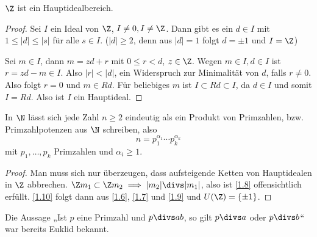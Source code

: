 \begin{lem} \label{1.9}
	$\Z$ ist ein Hauptidealbereich.
	\begin{proof}
		Sei $I$ ein Ideal von $\Z$, $I \neq 0, I \neq \Z$.
		Dann gibt es ein $d \in I$ mit $1 \le |d| \le |s|$ für alle $s \in I$.
		($|d| \ge 2$, denn aus $|d|=1$ folgt $d = \pm 1$ und $I = \Z$)

		Sei $m \in I$, dann $m = zd + r$ mit $0 \le r < d$, $z \in \Z$.
		Wegen $m \in I, d\in I$ ist $r = zd - m \in I$.
		Also $|r| < |d|$, ein Widerspruch zur Minimalität von $d$, falls $r \neq 0$.
		Also folgt $r = 0$ und $m \in Rd$.
		Für beliebiges $m$ ist $I \subset Rd \subset I$, da $d \in I$ und somit $I = Rd$.
		Also ist $I$ ein Hauptideal.
	\end{proof}
\end{lem}

\begin{st} \label{1.10}
	In $\N$ lässt sich jede Zahl $n \ge 2$ eindeutig als ein Produkt von Primzahlen, bzw. Primzahlpotenzen aus $\N$ schreiben, also
	\[
		n = p_1^{\alpha_1} \dotsb p_k^{\alpha_k}
	\]
	mit $p_1, \dotsc, p_k$ Primzahlen und $\alpha_i \ge 1$.
	\begin{proof}
		Man muss sich nur überzeugen, dass aufsteigende Ketten von Hauptidealen in $\Z$ abbrechen.
		$\Z m_1 \subset \Z m_2 \implies |m_2| \divs  |m_1|$, also ist \ref{1.8} offensichtlich erfüllt. 
		\ref{1.10} folgt dann aus \ref{1.6}, \ref{1.7} und \ref{1.9} und $U(\Z) = \{ \pm 1 \}$.
	\end{proof}
\end{st}

\begin{nt*}
	Die Aussage „Ist $p$ eine Primzahl und $p \divs  ab$, so gilt $p \divs  a$ oder $p \divs  b$“ war bereits Euklid bekannt.
\end{nt*}


